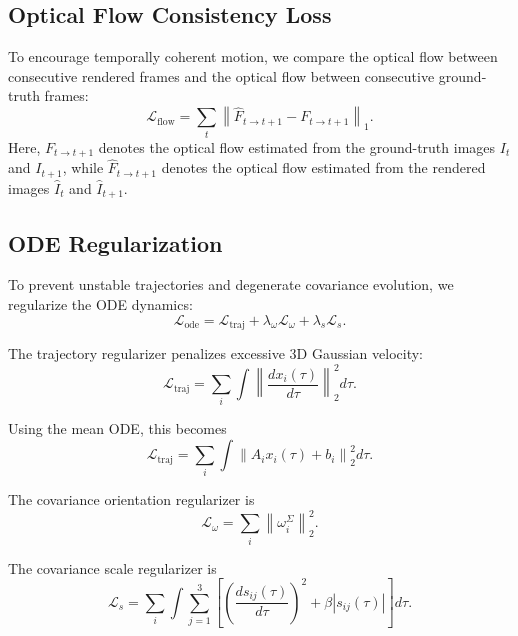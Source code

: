 \documentclass[11pt]{article}
\begin{document}
\subsection{Optical Flow Consistency Loss}

To encourage temporally coherent motion, we compare the optical flow between consecutive rendered frames and the optical flow between consecutive ground-truth frames:
\begin{equation}
\mathcal{L}_{\text{flow}}
=
\sum_t
\left\|
\hat F_{t\to t+1}
-
F_{t\to t+1}
\right\|_1.
\end{equation}
Here, $F_{t\to t+1}$ denotes the optical flow estimated from the ground-truth images $I_t$ and $I_{t+1}$, while $\hat F_{t\to t+1}$ denotes the optical flow estimated from the rendered images $\hat I_t$ and $\hat I_{t+1}$.

\subsection{ODE Regularization}

To prevent unstable trajectories and degenerate covariance evolution, we regularize the ODE dynamics:
\begin{equation}
\mathcal{L}_{\text{ode}}
=
\mathcal{L}_{\text{traj}}
+
\lambda_{\omega}\mathcal{L}_{\omega}
+
\lambda_s\mathcal{L}_{s}.
\end{equation}

The trajectory regularizer penalizes excessive 3D Gaussian velocity:
\begin{equation}
\mathcal{L}_{\text{traj}}
=
\sum_i
\int
\left\|
\frac{d x_i(\tau)}{d\tau}
\right\|_2^2
d\tau.
\end{equation}

Using the mean ODE, this becomes
\begin{equation}
\mathcal{L}_{\text{traj}}
=
\sum_i
\int
\left\|
A_i x_i(\tau)+b_i
\right\|_2^2
d\tau.
\end{equation}

The covariance orientation regularizer is
\begin{equation}
\mathcal{L}_{\omega}
=
\sum_i
\left\|
\omega_i^\Sigma
\right\|_2^2.
\end{equation}

The covariance scale regularizer is
\begin{equation}
\mathcal{L}_{s}
=
\sum_i
\int
\sum_{j=1}^3
\left[
\left(
\frac{d s_{ij}(\tau)}{d\tau}
\right)^2
+
\beta |s_{ij}(\tau)|
\right]
d\tau.
\end{equation}
\end{document}
